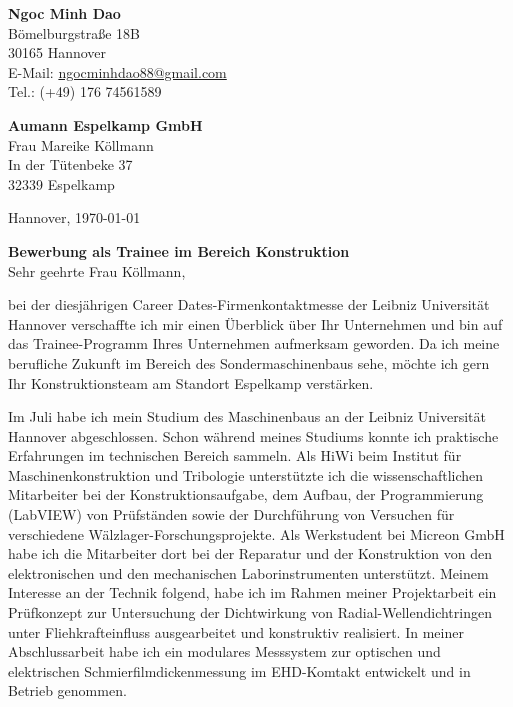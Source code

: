 \documentclass[11pt,a4paper]{letter}
\newcommand{\FirmaName}{Aumann Espelkamp GmbH}
\newcommand{\FirmaAdresseLineOne}{In der Tütenbeke 37}
\newcommand{\FirmaAdresseLineTwo}{32339 Espelkamp}
\newcommand{\AnsprechpartnerVoll}{Frau Mareike Köllmann}
\newcommand{\Ansprechpartner}{Maier}
\newcommand{\Ansprechpartnerin}{Köllmann}
\begin{document}
\pagestyle{empty}

\begin{flushleft}
    \textbf{Ngoc Minh Dao}\\
    Bömelburgstraße 18B\\
    30165 Hannover\\
    E-Mail: \href{mailto:ngocminhdao88@gmail.com}{ngocminhdao88@gmail.com}\\
    Tel.: (+49) 176 74561589
\end{flushleft}

\begin{flushleft}
    \textbf{\FirmaName}\\
    \AnsprechpartnerVoll\\
    \FirmaAdresseLineOne\\
    \FirmaAdresseLineTwo\\
\end{flushleft}

\begin{flushright}
    Hannover, \today
\end{flushright}

\textbf{Bewerbung als Trainee im Bereich Konstruktion}\\

Sehr geehrte Frau \Ansprechpartnerin,

bei der diesjährigen Career Dates-Firmenkontaktmesse der Leibniz Universität Hannover verschaffte ich mir einen Überblick über Ihr Unternehmen und bin auf das Trainee-Programm Ihres Unternehmen aufmerksam geworden.
Da ich meine berufliche Zukunft im Bereich des Sondermaschinenbaus sehe, möchte ich gern Ihr Konstruktionsteam am Standort Espelkamp verstärken.

Im Juli habe ich mein Studium des Maschinenbaus an der Leibniz Universität Hannover abgeschlossen.
Schon während meines Studiums konnte ich praktische Erfahrungen im technischen Bereich sammeln.
Als HiWi beim Institut für Maschinenkonstruktion und Tribologie unterstützte ich die wissenschaftlichen Mitarbeiter bei der Konstruktionsaufgabe, dem Aufbau, der Programmierung (LabVIEW) von Prüfständen sowie der Durchführung von Versuchen für verschiedene Wälzlager-Forschungsprojekte.
Als Werkstudent bei Micreon GmbH habe ich die Mitarbeiter dort bei der Reparatur und der Konstruktion von den elektronischen und den mechanischen Laborinstrumenten unterstützt.
Meinem Interesse an der Technik folgend, habe ich im Rahmen meiner Projektarbeit ein Prüfkonzept zur Untersuchung der Dichtwirkung von Radial-Wellendichtringen unter Fliehkrafteinfluss ausgearbeitet und konstruktiv realisiert.
In meiner Abschlussarbeit habe ich ein modulares Messsystem zur optischen und elektrischen Schmierfilmdickenmessung im EHD-Komtakt entwickelt und in Betrieb genommen.
\end{document}
